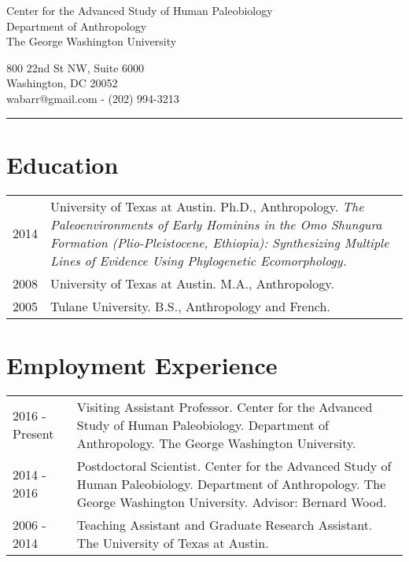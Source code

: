 \documentclass{article}
\begin{document}
\begin{center}
\end{center}

\vspace{15pt}

\noindent\begin{minipage}{.60\textwidth}
\begin{flushleft}
Center for the Advanced Study of Human Paleobiology\\
Department of Anthropology\\
The George Washington University\\
\end{flushleft}
\end{minipage}
\begin{minipage}{.395\textwidth}
\begin{flushright}
800 22nd St NW, Suite 6000\\
Washington, DC 20052 \\
wabarr@gmail.com - (202) 994-3213\\
\end{flushright}
\end{minipage}


\noindent\rule[-2mm]{\textwidth}{1pt}

\section*{Education}
\begin{tabular}{p{}p{}}
2014 & University of Texas at Austin. Ph.D., Anthropology. \emph{The Paleoenvironments of Early Hominins in the Omo Shungura Formation (Plio-Pleistocene, Ethiopia): Synthesizing Multiple Lines of Evidence Using Phylogenetic Ecomorphology.}\\[4pt]
2008 & University of Texas at Austin. M.A., Anthropology. \\[4pt]
2005 & Tulane University. B.S., Anthropology and French.\\
\end{tabular}

\section*{Employment Experience}
\begin{tabular}{p{}p{}}
2016 - Present & Visiting Assistant Professor. Center for the Advanced Study of Human Paleobiology. Department of Anthropology. The George Washington University.\\[4pt]
2014 - 2016 & Postdoctoral Scientist. Center for the Advanced Study of Human Paleobiology. Department of Anthropology. The George Washington University. Advisor: Bernard Wood.\\[4pt]
2006 - 2014 & Teaching Assistant and Graduate Research Assistant. The University of Texas at Austin.

\end{tabular}
\end{document}
